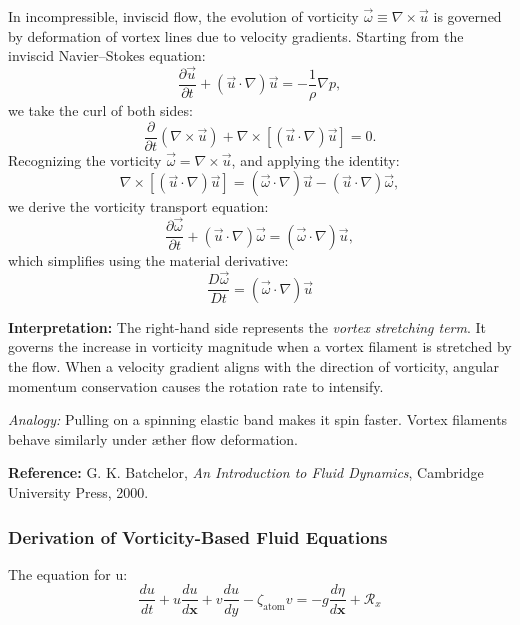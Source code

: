 \documentclass[12pt]{article}
\begin{document}
\begin{tcolorbox}[title=Vortex Stretching in Inviscid Æther Flow, colframe=blue!50!black, colback=blue!5!white, coltitle=white, fonttitle=\bfseries,
    sharp corners=south]
In incompressible, inviscid flow, the evolution of vorticity \( \vec{\omega} \equiv \nabla \times \vec{u} \) is governed by deformation of vortex lines due to velocity gradients. Starting from the inviscid Navier--Stokes equation:
\[
\frac{\partial \vec{u}}{\partial t} + (\vec{u} \cdot \nabla)\vec{u} = -\frac{1}{\rho} \nabla p,
\]
we take the curl of both sides:
\[
\frac{\partial}{\partial t} (\nabla \times \vec{u}) + \nabla \times \left[ (\vec{u} \cdot \nabla)\vec{u} \right] = 0.
\]
Recognizing the vorticity \( \vec{\omega} = \nabla \times \vec{u} \), and applying the identity:
\[
\nabla \times \left[ (\vec{u} \cdot \nabla)\vec{u} \right] = (\vec{\omega} \cdot \nabla)\vec{u} - (\vec{u} \cdot \nabla)\vec{\omega},
\]
we derive the vorticity transport equation:
\[
\frac{\partial \vec{\omega}}{\partial t} + (\vec{u} \cdot \nabla)\vec{\omega} = (\vec{\omega} \cdot \nabla)\vec{u},
\]
which simplifies using the material derivative:
\begin{equation}
\boxed{ \frac{D \vec{\omega}}{D t} = (\vec{\omega} \cdot \nabla)\vec{u} }
\end{equation}

\textbf{Interpretation:} The right-hand side represents the \emph{vortex stretching term}. It governs the increase in vorticity magnitude when a vortex filament is stretched by the flow. When a velocity gradient aligns with the direction of vorticity, angular momentum conservation causes the rotation rate to intensify.

\medskip

\textit{Analogy:} Pulling on a spinning elastic band makes it spin faster. Vortex filaments behave similarly under æther flow deformation.

\begin{flushright}
    \textbf{Reference:} G. K. Batchelor, \textit{An Introduction to Fluid Dynamics}, Cambridge University Press, 2000.
\end{flushright}
\end{tcolorbox}


    \subsubsection{Derivation of Vorticity-Based Fluid Equations}
    The equation for u:
    \begin{equation}
        \frac{d u}{d t}+u \frac{d u}{d \boldsymbol{x}}+v \frac{d u}{d y}-\zeta_{\text {atom}} v=-g \frac{d \eta}{d \boldsymbol{x}}+\mathcal{R}_x\label{eq:momentum_u}
    \end{equation}
\end{document}
